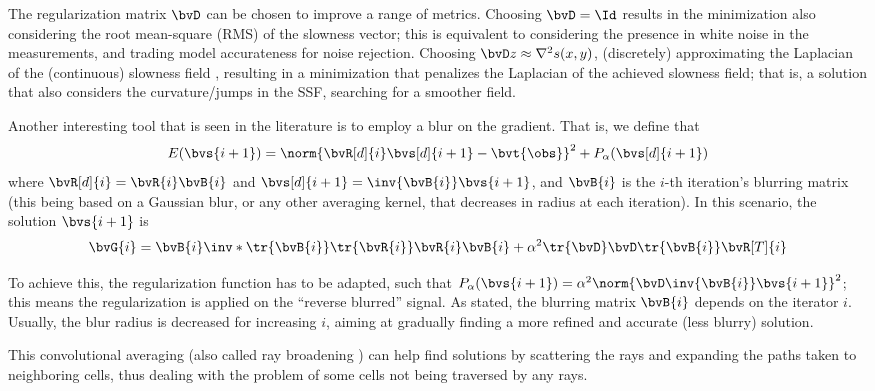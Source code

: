 The regularization matrix $\bvD$ can be chosen to improve a range of metrics. Choosing $\bvD = \Id$ \cite{phillips_traveltime_1991} results in the minimization also considering the root mean-square (RMS) of the slowness vector; this is equivalent to considering the presence in white noise in the measurements, and trading model accurateness for noise rejection. Choosing $\bvD z \approx \nabla^2 s(x,y)$, (discretely) approximating the Laplacian of the (continuous) slowness field \cite{zhang_nonlinear_1998,ali_opensource_2019}, resulting in a minimization that penalizes the Laplacian of the achieved slowness field; that is, a solution that also considers the curvature/jumps in the SSF, searching for a smoother field.

Another interesting tool that is seen in the literature \cite{phillips_traveltime_1991,meyerholtz_convolutional_1989} is to employ a blur on the gradient. That is, we define that
\begin{equation}
	E(\bvs{i+1}) = \norm{\bvR[d]{i} \bvs[d]{i+1} - \bvt{\obs}}^2 + P_\alpha(\bvs[d]{i+1})
\end{equation}
where $\bvR[d]{i} = \bvR{i}\bvB{i}$ and $\bvs[d]{i+1} = \inv{\bvB{i}} \bvs{i+1}$, and $\bvB{i}$ is the $i$-th iteration's blurring matrix (this being based on a Gaussian blur, or any other averaging kernel, that decreases in radius at each iteration). In this scenario, the solution $\bvs{i+1}$ is
\begin{equation}
	\bvG{i} = \bvB{i} \inv*{\tr{\bvB{i}} \tr{\bvR{i}} \bvR{i} \bvB{i} + \alpha^2 \tr{\bvD}\bvD} \tr{\bvB{i}} \bvR[T]{i}
\end{equation}

To achieve this, the regularization function has to be adapted, such that $P_{\alpha}(\bvs{i+1}) = \alpha^2 \norm{\bvD \inv{\bvB{i}} \bvs{i+1}}^2$; this means the regularization is applied on the ``reverse blurred'' signal. As stated, the blurring matrix $\bvB{i}$ depends on the iterator $i$. Usually, the blur radius is decreased for increasing $i$, aiming at gradually finding a more refined and accurate (less blurry) solution.

This convolutional averaging (also called ray broadening \cite{meyerholtz_convolutional_1989,phillips_traveltime_1991}) can help find solutions by scattering the rays and expanding the paths taken to neighboring cells, thus dealing with the problem of some cells not being traversed by any rays.